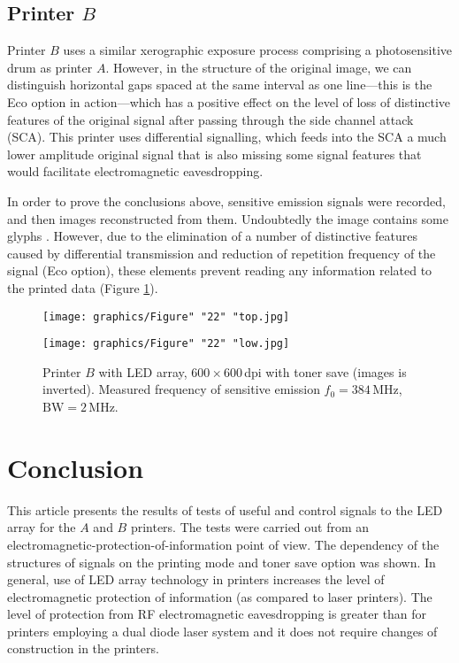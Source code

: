 \documentclass[12pt,a4paper]{article}
\begin{document}
\subsection{Printer $B$}

Printer $B$ uses a similar xerographic exposure process comprising a
photosensitive drum as printer $A$. However, in the structure of the original
image, we can distinguish horizontal gaps spaced at the same interval as one
line---this is the Eco option in action---which has a positive effect on the
level of
loss of distinctive features of the original signal after passing through the
side channel attack (SCA). This printer uses differential signalling, which
feeds into the SCA a much lower amplitude original signal that is also
missing some signal features that would facilitate electromagnetic
eavesdropping.

In order to prove the conclusions above, sensitive emission signals were
recorded, and then images reconstructed from them. Undoubtedly the image
contains some glyphs \cite{Jalilian2014a}. However, due to the
elimination of a number of distinctive features caused by differential
transmission and reduction of repetition frequency of the signal (Eco
option), these elements prevent reading any information related to the
printed data (Figure \ref{figure:Figure_22}).

\begin{figure}[ht]
    \centering
    \texttt{[image: graphics/Figure" "22" "top.jpg]}

    \bigskip

    \texttt{[image: graphics/Figure" "22" "low.jpg]}
    \caption{Printer $B$ with LED array, $600\times 600$\,dpi with toner
        save (images is inverted). Measured frequency of sensitive emission
        $f_0 = 384$\,\si{\mega\hertz}, $\text{BW}=2$\,\si{\mega\hertz}.}
    \label{figure:Figure_22}
\end{figure}

\section{Conclusion}

This article presents the results of tests of useful and control signals to
the LED array for the $A$ and $B$ printers. The tests were carried out from
an electromagnetic-protection-of-information point of view. The dependency of
the structures of signals on the printing mode and toner save option was
shown. In general, use of LED array technology in printers increases the
level of electromagnetic protection of information (as compared to laser
printers). The level of protection from RF electromagnetic eavesdropping is
greater than for printers employing a dual diode laser system
\cite{Kubiak2018c} and it does not require changes of construction in the
printers.
\end{document}
